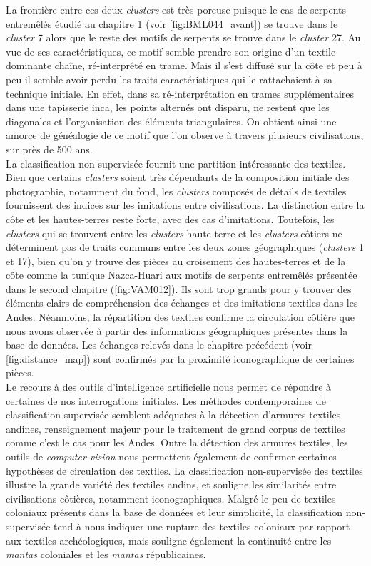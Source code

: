 \noindent La frontière entre ces deux \textit{clusters} est très poreuse puisque le cas de serpents entremêlés étudié au chapitre 1 (voir \ref{fig:BML044_avant}) se trouve dans le \textit{cluster} 7 alors que le reste des motifs de serpents se trouve dans le \textit{cluster} 27. Au vue de ses caractéristiques, ce motif semble prendre son origine d'un textile dominante chaîne, ré-interprété en trame. Mais il s'est diffusé sur la côte et peu à peu il semble avoir perdu les traits caractéristiques qui le rattachaient à sa technique initiale. En effet, dans sa ré-interprétation en trames supplémentaires dans une tapisserie inca, les points alternés ont disparu, ne restent que les diagonales et l'organisation des éléments triangulaires. On obtient ainsi une amorce de généalogie de ce motif que l'on observe à travers plusieurs civilisations, sur près de 500 ans.\\

La classification non-supervisée fournit une partition intéressante des textiles. Bien que certains \textit{clusters} soient très dépendants de la composition initiale des photographie, notamment du fond, les \textit{clusters} composés de détails de textiles fournissent des indices sur les imitations entre civilisations. La distinction entre la côte et les hautes-terres reste forte, avec des cas d'imitations. Toutefois, les \textit{clusters} qui se trouvent entre les \textit{clusters} \og haute-terre \fg \:et les \textit{clusters} \og côtiers \fg \:ne déterminent pas de traits communs entre les deux zones géographiques (\textit{clusters} 1 et 17), bien qu'on y trouve des pièces au croisement des hautes-terres et de la côte comme la tunique Nazca-Huari aux motifs de serpents entremêlés présentée dans le second chapitre (\ref{fig:VAM012}). Ils sont trop grands pour y trouver des éléments clairs de compréhension des échanges et des imitations textiles dans les Andes. Néanmoins, la répartition des textiles confirme la circulation côtière que nous avons observée à partir des informations géographiques présentes dans la base de données. Les échanges relevés dans le chapitre précédent (voir \ref{fig:distance_map}) sont confirmés par la proximité iconographique de certaines pièces. \\

Le recours à des outils d'intelligence artificielle nous permet de répondre à certaines de nos interrogations initiales. Les méthodes contemporaines de classification supervisée semblent adéquates à la détection d'armures textiles andines, renseignement majeur pour le traitement de grand corpus de textiles comme c'est le cas pour les Andes. Outre la détection des armures textiles, les outils de \textit{computer vision} nous permettent également de confirmer certaines hypothèses de circulation des textiles. La classification non-supervisée des textiles illustre la grande variété des textiles andins, et souligne les similarités entre civilisations côtières, notamment iconographiques. Malgré le peu de textiles coloniaux présents dans la base de données et leur simplicité, la classification non-supervisée tend à nous indiquer une rupture des textiles coloniaux par rapport aux textiles archéologiques, mais souligne également la continuité entre les \textit{mantas} coloniales et les \textit{mantas} républicaines.
